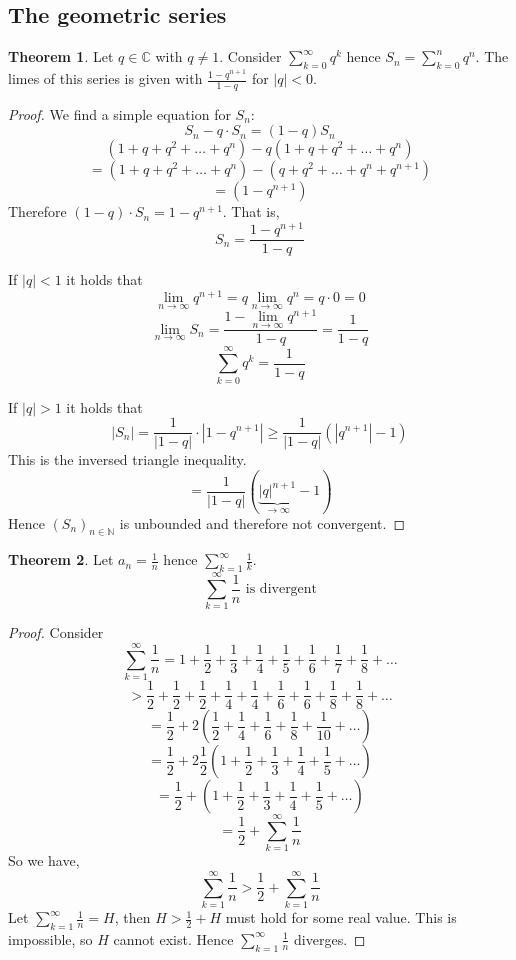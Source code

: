 \documentclass[a4paper,landscape,twocolumn]{article}
\theoremstyle{definition}
\newtheorem{theorem}{Theorem}
\newcommand\abs[1]{\left|#1\right|}
\newcommand\seq[1]{{\left(#1\right)}_{n \in \mathbb N}}
\begin{document}
\subsection{The geometric series}
\begin{theorem}
  Let $q \in \mathbb C$ with $q \neq 1$.
  Consider $\sum_{k=0}^\infty q^k$ hence $S_n = \sum_{k=0}^{n} q^n$.
  The limes of this series is given with $\frac{1 - q^{n+1}}{1 - q}$ for $\abs{q} < 0$.
\end{theorem}
\begin{proof}
  We find a simple equation for $S_n$:
  \[ S_n - q \cdot S_n = (1 - q) S_n \]
  \[ (1 + q + q^2 + \dots + q^n) - q (1 + q + q^2 + \dots + q^n) \]
  \[ = (1 + q + q^2 + \dots + q^n) - (q + q^2 + \dots + q^n + q^{n+1}) \]
  \[ = (1 - q^{n+1}) \]
  Therefore $(1 - q) \cdot S_n = 1 - q^{n+1}$. That is,
  \[ S_n = \frac{1 - q^{n+1}}{1 - q} \]

  If $\abs{q} < 1$ it holds that
  \[ \lim_{n\to\infty} q^{n+1} = q \lim_{n\to\infty} q^n = q \cdot 0 = 0 \]
  \[ \lim_{n\to\infty} S_n = \frac{1 - \lim_{n\to\infty} q^{n+1}}{1 - q} = \frac{1}{1 - q} \]
  \[ \sum_{k=0}^\infty q^k = \frac{1}{1 - q} \]

  If $\abs{q} > 1$ it holds that
  \[
    \abs{S_n}
    = \frac{1}{\abs{1 - q}} \cdot \abs{1 - q^{n+1}}
    \geq \frac{1}{\abs{1 - q}} \left(\abs{q^{n+1}} - 1\right)
  \]
  This is the inversed triangle inequality.
  \[ = \frac{1}{\abs{1 - q}} \left(\underbrace{\abs{q}^{n+1}}_{\to\infty} - 1\right) \]
  Hence $\seq{S_n}$ is unbounded and therefore not convergent.
\end{proof}

\begin{theorem}
  Let $a_n = \frac1n$ hence $\sum_{k=1}^\infty \frac1k$.
  \[ \sum_{k=1}^\infty \frac1n \text{ is divergent} \]
\end{theorem}
\begin{proof}
  Consider
  \[ \sum_{k=1}^\infty \frac1n = 1 + \frac12 + \frac13 + \frac14 + \frac15 + \frac16 + \frac17 + \frac18 + \dots \]
  \[ > \frac12 + \frac12 + \frac12 + \frac14 + \frac14 + \frac16 + \frac16 + \frac18 + \frac18 + \dots \]
  \[ = \frac12 + 2 \left(\frac12 + \frac14 + \frac16 + \frac18 + \frac1{10} + \dots\right) \]
  \[ = \frac12 + 2 \frac12 \left(1 + \frac12 + \frac13 + \frac14 + \frac15 + \dots\right) \]
  \[ = \frac12 + \left(1 + \frac12 + \frac13 + \frac14 + \frac15 + \dots\right) \]
  \[ = \frac12 + \sum_{k=1}^\infty \frac1n \]
  So we have,
  \[ \sum_{k=1}^\infty \frac1n > \frac12 + \sum_{k=1}^\infty \frac1n \]
  Let $\sum_{k=1}^\infty \frac1n = H$, then $H > \frac12 + H$ must hold for some real value.
  This is impossible, so $H$ cannot exist. Hence $\sum_{k=1}^\infty \frac1n$ diverges.
\end{proof}
\end{document}

